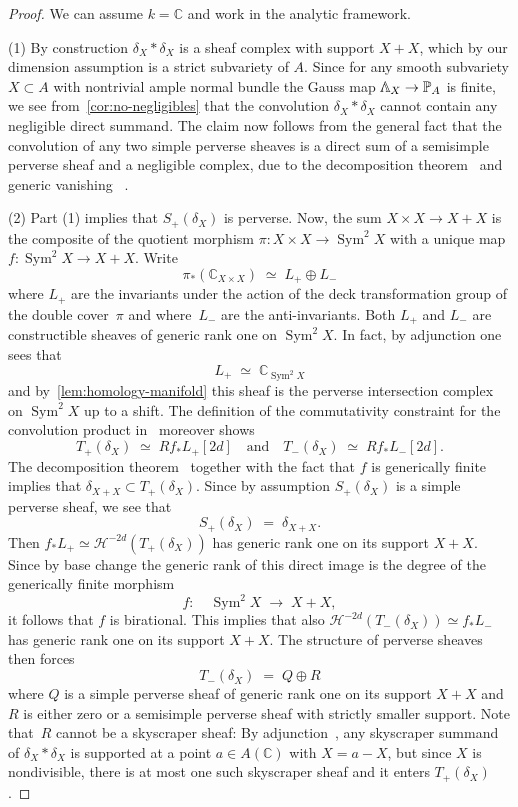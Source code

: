 \documentclass[a4paper]{amsart}
\newcommand{\bbC}{\mathbb{C}}
\newcommand{\bbP}{\mathbb{P}}
\newcommand{\bbV}{\mathbb{V}}
\newcommand{\PLambda}{\scalerel*{{\rotatebox[origin=c]{180}{$\bbV$}}}{\bbV}}
\DeclareMathOperator{\Sym}{Sym}
\theoremstyle{plain}
\theoremstyle{definition}
\numberwithin{equation}{section}
\begin{document}
\begin{proof} We can assume $k= \bbC$ and work in the analytic framework.\medskip

(1) By construction $\delta_X*\delta_X$ is a sheaf complex with support $X+X$, which by our dimension assumption is a strict subvariety of $A$.  Since for any smooth subvariety $X\subset A$ with nontrivial ample normal bundle the Gauss map $\PLambda_X \to \bbP_A$ is finite, we see from~\cref{cor:no-negligibles} that the convolution $\delta_X * \delta_X$ cannot contain any negligible direct summand. The claim now follows from the general fact that the convolution of any two simple perverse sheaves is a direct sum of a semisimple perverse sheaf and a negligible complex, due to the decomposition theorem~\cite[th.~6.2.5]{BBDG} and generic vanishing
~\cite[lemma~4.3c]{KraemerSemiabelian}.

\medskip 

(2) Part (1) implies that $S_+(\delta_X)$ is perverse. Now, the sum $X \times X \to X + X$ is the composite of the quotient morphism $\pi \colon X \times X \to \Sym^2 X$ with a unique map $f \colon \Sym^2 X \to X + X$. Write
%
\[ \pi_*(\bbC_{X\times X}) \;\simeq\; L_+ \oplus L_- \]
%
where $L_+$ are the invariants under the action of the deck transformation group of the double cover~$\pi$ and where~$L_-$ are the anti-invariants. Both $L_+$ and $L_-$ are constructible sheaves of generic rank one on $\Sym^2 X$. In fact, by adjunction one sees that
%
\[
 L_+  \;\simeq\; \bbC_{\Sym^2 X}
\] 
%
and by~\cref{lem:homology-manifold} this sheaf is the perverse intersection complex on $\Sym^2 X$ up to a shift. 
The definition of the commutativity constraint for the convolution product in~\cite[sect.~2.1]{WeissauerBNSheaves} moreover shows
%
\[
 T_+(\delta_X) \;\simeq\; Rf_* L_+[2d]
 \quad \text{and} \quad 
 T_-(\delta_X) \;\simeq\; Rf_* L_-[2d].
\]
%
The decomposition theorem~\cite[th.~6.2.5]{BBDG} together with the fact that $f$ is generically finite implies that $\delta_{X+X} \subset T_+(\delta_X)$. Since by assumption $S_+(\delta_X)$ is a simple perverse sheaf, we see that 
%
\[
 S_+(\delta_X) \;=\;  \delta_{X+X}.
\]
%
Then
%
$f_* L_+ \simeq \mathcal{H}^{-2d}(T_+(\delta_X))$
%
has generic rank one on its support $X+X$. Since by base change the generic rank of this direct image is the degree of the generically finite morphism 
%
\[
 f\colon \quad \Sym^2 X \;\longrightarrow\; X+X,
\]
%
it follows that $f$ is birational. This implies that also $\mathcal{H}^{-2d}(T_-(\delta_X)) \simeq f_* L_-$ has generic rank one on its support $X+X$. The structure of perverse sheaves then forces
%
\[
 T_-(\delta_X) \;=\; Q \oplus R
\] 
%
where $Q$ is a simple perverse sheaf of generic rank one on its support $X+X$ and~$R$ is either zero or a semisimple perverse sheaf with strictly smaller support. Note that~$R$ cannot be a skyscraper sheaf: By adjunction~\cite[cor.~1]{WeissauerBNSheaves}, any skyscraper summand of $\delta_X \ast \delta_X$ is supported at a point $a \in A(\bbC)$ with $X = a - X$, but since $X$ is nondivisible, there is at most one such skyscraper sheaf and it enters $T_+(\delta_X)$. \medskip


\end{proof}
\end{document}
